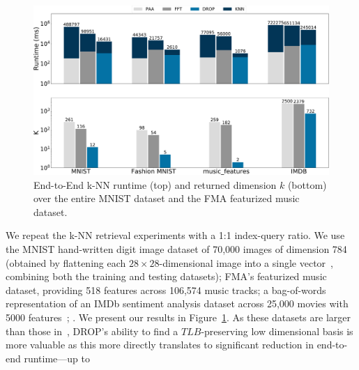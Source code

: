 \begin{figure}
\includegraphics[width=\linewidth]{figs/nonts-revision.pdf}
\caption[]{End-to-End k-NN runtime (top) and returned dimension $k$ (bottom) over the entire MNIST dataset and the FMA featurized music dataset.}
\label{fig:beyond}
\end{figure}

We repeat the k-NN retrieval experiments with a 1:1 index-query ratio.
We use the MNIST hand-written digit image dataset of 70,000 images of dimension 784 (obtained by flattening each $28 \times 28$-dimensional image into a single vector~\cite{mnist}, combining both the training and testing datasets); FMA's featurized music dataset, providing 518 features across 106,574 music tracks; a bag-of-words representation of an IMDb sentiment analysis dataset across 25,000 movies with 5000 features~\cite{imdb}; .  
We present our results in Figure~\ref{fig:beyond}.
As these datasets are larger than those in~\cite{ucr}, DROP's ability to find a $TLB$-preserving low dimensional basis is more valuable as this more directly translates to significant reduction in end-to-end runtime---up to 

